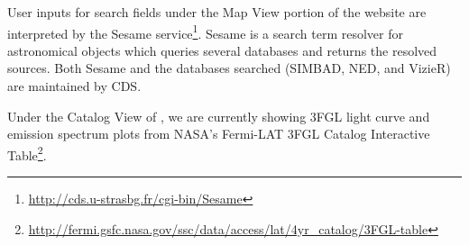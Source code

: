 User inputs for search fields under the Map View portion of the website are interpreted by the Sesame service\footnote[6]{\url{http://cds.u-strasbg.fr/cgi-bin/Sesame}}. Sesame is a search term resolver for astronomical objects which queries several databases and returns the resolved sources. Both Sesame and the databases searched (SIMBAD, NED, and VizieR) are maintained by CDS.

Under the Catalog View of \gammasky, we are currently showing 3FGL light curve and emission spectrum plots from NASA's Fermi-LAT 3FGL Catalog Interactive Table\footnote[7]{\url{http://fermi.gsfc.nasa.gov/ssc/data/access/lat/4yr_catalog/3FGL-table}}.
